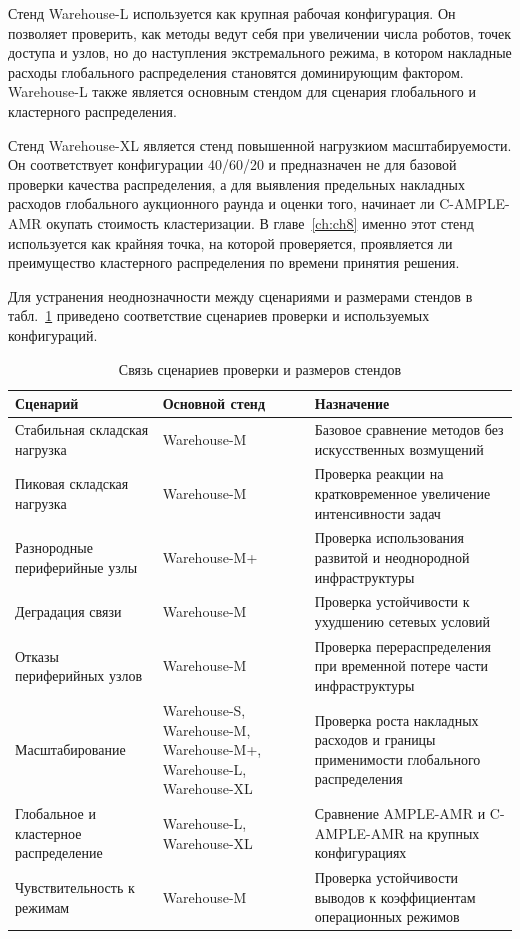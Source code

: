 Стенд Warehouse-L используется как крупная рабочая конфигурация. Он позволяет проверить, как методы ведут себя при увеличении числа роботов, точек доступа и узлов, но до наступления экстремального режима, в котором накладные расходы глобального распределения становятся доминирующим фактором. Warehouse-L также является основным стендом для сценария глобального и кластерного распределения.

Стенд Warehouse-XL является стенд повышенной нагрузкиом масштабируемости. Он соответствует конфигурации 40/60/20 и предназначен не для базовой проверки качества распределения, а для выявления предельных накладных расходов глобального аукционного раунда и оценки того, начинает ли C-AMPLE-AMR окупать стоимость кластеризации. В главе~\ref{ch:ch8} именно этот стенд используется как крайняя точка, на которой проверяется, проявляется ли преимущество кластерного распределения по времени принятия решения.

Для устранения неоднозначности между сценариями и размерами стендов в табл.~\ref{tab:ch6_scenarios_to_stands} приведено соответствие сценариев проверки и используемых конфигураций.

\begin{table}[h]
	\centering
	\small
	\caption{Связь сценариев проверки и размеров стендов}
	\label{tab:ch6_scenarios_to_stands}
	\begin{tabular}{|p{}|p{}|p{}|}
		\hline
		\textbf{Сценарий} & \textbf{Основной стенд} & \textbf{Назначение} \\
		\hline
		Стабильная складская нагрузка & Warehouse-M & Базовое сравнение методов без искусственных возмущений \\
		\hline
		Пиковая складская нагрузка & Warehouse-M & Проверка реакции на кратковременное увеличение интенсивности задач \\
		\hline
		Разнородные периферийные узлы & Warehouse-M+ & Проверка использования развитой и неоднородной инфраструктуры \\
		\hline
		Деградация связи & Warehouse-M & Проверка устойчивости к ухудшению сетевых условий \\
		\hline
		Отказы периферийных узлов & Warehouse-M & Проверка перераспределения при временной потере части инфраструктуры \\
		\hline
		Масштабирование & Warehouse-S, Warehouse-M, Warehouse-M+, Warehouse-L, Warehouse-XL & Проверка роста накладных расходов и границы применимости глобального распределения \\
		\hline
		Глобальное и кластерное распределение & Warehouse-L, Warehouse-XL & Сравнение AMPLE-AMR и C-AMPLE-AMR на крупных конфигурациях \\
		\hline
		Чувствительность к режимам & Warehouse-M & Проверка устойчивости выводов к коэффициентам операционных режимов \\
		\hline
	\end{tabular}
\end{table}

